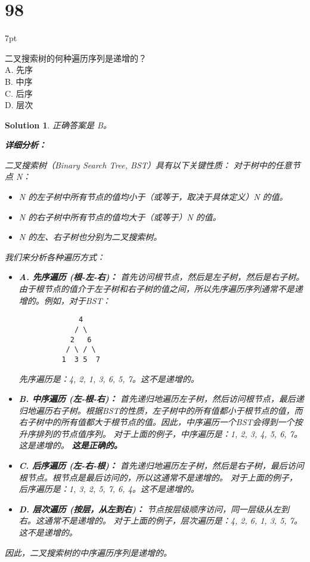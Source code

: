 \documentclass[UTF8]{report}
\newtheorem{solution}{Solution}
\theoremstyle{MyLineTheoremStyle} %
\theoremstyle{MyBlockTheoremStyle} %
\theoremstyle{MySubsubsectionStyle} %
\newenvironment{graybox}{%
        \def\FrameCommand{%
        \hspace{1pt}%
        {\color{gray}\small \vrule width 2pt}%
        {\color{graybox_color}\vrule width 4pt}%
        \colorbox{graybox_color}%
        }%
        \MakeFramed{\advance\hsize-\width\FrameRestore}%
        \noindent\hspace{-4.55pt}%
        \begin{adjustwidth}{}{7pt}%
        \vspace{2pt}\vspace{2pt}%
        }
        {%
        \vspace{2pt}\end{adjustwidth}\endMakeFramed%
        }
\begin{document}
\section*{98}
\begin{graybox}
二叉搜索树的何种遍历序列是递增的？ \\
A. 先序 \\
B. 中序 \\
C. 后序 \\
D. 层次
\end{graybox}

\begin{solution}
正确答案是 B。

\textbf{详细分析：}

二叉搜索树（Binary Search Tree, BST）具有以下关键性质：
对于树中的任意节点 N：
\begin{itemize}
    \item N 的左子树中所有节点的值均小于（或等于，取决于具体定义）N 的值。
    \item N 的右子树中所有节点的值均大于（或等于）N 的值。
    \item N 的左、右子树也分别为二叉搜索树。
\end{itemize}

我们来分析各种遍历方式：
\begin{itemize}
    \item \textbf{A. 先序遍历 (根-左-右)：}
        首先访问根节点，然后是左子树，然后是右子树。由于根节点的值介于左子树和右子树的值之间，所以先序遍历序列通常不是递增的。例如，对于BST：
        \begin{verbatim}
              4
             / \
            2   6
           / \ / \
          1  3 5  7
        \end{verbatim}
        先序遍历是：4, 2, 1, 3, 6, 5, 7。这不是递增的。

    \item \textbf{B. 中序遍历 (左-根-右)：}
        首先递归地遍历左子树，然后访问根节点，最后递归地遍历右子树。根据BST的性质，左子树中的所有值都小于根节点的值，而右子树中的所有值都大于根节点的值。因此，中序遍历一个BST会得到一个按升序排列的节点值序列。
        对于上面的例子，中序遍历是：1, 2, 3, 4, 5, 6, 7。这是递增的。
        \textbf{这是正确的。}

    \item \textbf{C. 后序遍历 (左-右-根)：}
        首先递归地遍历左子树，然后是右子树，最后访问根节点。根节点是最后访问的，所以这通常不是递增的。
        对于上面的例子，后序遍历是：1, 3, 2, 5, 7, 6, 4。这不是递增的。

    \item \textbf{D. 层次遍历 (按层，从左到右)：}
        节点按层级顺序访问，同一层级从左到右。这通常不是递增的。
        对于上面的例子，层次遍历是：4, 2, 6, 1, 3, 5, 7。这不是递增的。
\end{itemize}

因此，二叉搜索树的中序遍历序列是递增的。
\end{solution}
\end{document}
